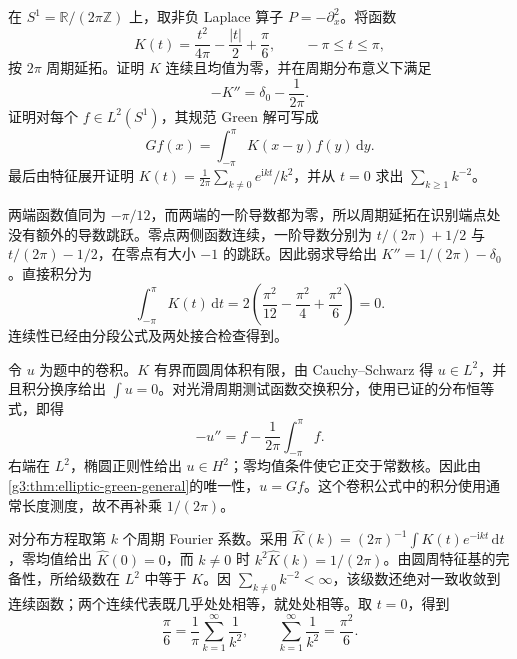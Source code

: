 \begin{exercise}\label{g3:ex:circle-green-kernel}
	在 \(S^1=\mathbb R/(2\pi\mathbb Z)\) 上，取非负 Laplace 算子 \(P=-\partial_x^2\)。将函数
	\[
		K(t)=\frac{t^2}{4\pi}-\frac{|t|}2+\frac\pi6,
		\qquad -\pi\le t\le\pi,
	\]
	按 \(2\pi\) 周期延拓。证明 \(K\) 连续且均值为零，并在周期分布意义下满足
	\[
		-K''=\delta_0-\frac1{2\pi}.
	\]
	证明对每个 \(f\in L^2(S^1)\)，其规范 Green 解可写成
	\[
		Gf(x)=\int_{-\pi}^\pi K(x-y)f(y)\,\mathrm dy.
	\]
	最后由特征展开证明
	\(K(t)=\frac1{2\pi}\sum_{k\ne0}e^{\mathrm ikt}/k^2\)，并从 \(t=0\) 求出 \(\sum_{k\ge1}k^{-2}\)。
\end{exercise}
\begin{solution}
	两端函数值同为 \(-\pi/12\)，而两端的一阶导数都为零，所以周期延拓在识别端点处没有额外的导数跳跃。零点两侧函数连续，一阶导数分别为 \(t/(2\pi)+1/2\) 与 \(t/(2\pi)-1/2\)，在零点有大小 \(-1\) 的跳跃。因此弱求导给出 \(K''=1/(2\pi)-\delta_0\)。直接积分为
	\[
		\int_{-\pi}^\pi K(t)\,\mathrm dt
		=2\left(\frac{\pi^2}{12}-\frac{\pi^2}4+\frac{\pi^2}6\right)=0.
	\]
	连续性已经由分段公式及两处接合检查得到。

	令 \(u\) 为题中的卷积。\(K\) 有界而圆周体积有限，由 Cauchy--Schwarz 得 \(u\in L^2\)，并且积分换序给出 \(\int u=0\)。对光滑周期测试函数交换积分，使用已证的分布恒等式，即得
	\[
		-u''=f-\frac1{2\pi}\int_{-\pi}^\pi f.
	\]
	右端在 \(L^2\)，椭圆正则性给出 \(u\in H^2\)；零均值条件使它正交于常数核。因此由\cref{g3:thm:elliptic-green-general}的唯一性，\(u=Gf\)。这个卷积公式中的积分使用通常长度测度，故不再补乘 \(1/(2\pi)\)。

	对分布方程取第 \(k\) 个周期 Fourier 系数。采用 \(\widehat K(k)=(2\pi)^{-1}\int K(t)e^{-\mathrm ikt}\,\mathrm dt\)，零均值给出 \(\widehat K(0)=0\)，而 \(k\ne0\) 时
	\(k^2\widehat K(k)=1/(2\pi)\)。由圆周特征基的完备性，所给级数在 \(L^2\) 中等于 \(K\)。因 \(\sum_{k\ne0}k^{-2}<\infty\)，该级数还绝对一致收敛到连续函数；两个连续代表既几乎处处相等，就处处相等。取 \(t=0\)，得到
	\[
		\frac\pi6=\frac1\pi\sum_{k=1}^\infty\frac1{k^2},
		\qquad \sum_{k=1}^\infty\frac1{k^2}=\frac{\pi^2}6.
	\]
\end{solution}

